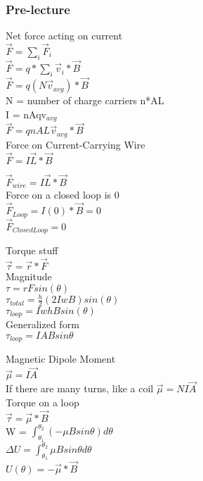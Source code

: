 \documentclass{article}
\begin{document}
\subsubsection{Pre-lecture}

\noindent
Net force acting on current \\
$\vec{F} = \sum^{}_{i} \vec{F}_i$ \\
$\vec{F} = q*\sum^{}_{i} \vec{v}_i * \vec{B}$ \\
$\vec{F} = q(N\vec{v}_{avg}) * \vec{B}$ \\
N = number of charge carriers n*AL \\
I = nAqv$_{avg}$ \\
$\vec{F} = qnAL\vec{v}_{avg}*\vec{B}$ \\
Force on Current-Carrying Wire \\
$\vec{F} = I\vec{L}*\vec{B}$

\vspace{2mm}

\noindent
$\vec{F}_{wire} = I\vec{L}*\vec{B}$ \\
Force on a closed loop is 0 \\
$\vec{F}_{Loop} = I(0)*\vec{B} = 0$ \\
$\vec{F}_{Closed Loop} = 0$

\vspace{2mm}

\noindent
Torque stuff \\
$\vec{\tau} = \vec{r} * \vec{F}$ \\
Magnitude \\
$\tau = rF sin(\theta)$ \\
$\tau_{total} = \frac{h}{2}(2IwB)sin(\theta)$ \\
$\tau_{loop} = IwhBsin(\theta)$ \\
Generalized form \\
$\tau_{loop} = IAB sin \theta$

\vspace{2mm}

\noindent
Magnetic Dipole Moment \\
$\vec{\mu} = I\vec{A}$ \\
If there are many turns, like a coil
$\vec{\mu} = NI\vec{A}$ \\
Torque on a loop \\
$\vec{\tau} = \vec{\mu}*\vec{B}$ \\
W = $\int_{\theta_1}^{\theta_2}(-\mu B sin \theta) d\theta$ \\
$\Delta U = \int_{\theta_1}^{\theta_2} \mu B sin \theta d \theta$ \\
$U(\theta) = - \vec{\mu} * \vec{B}$
\end{document}
